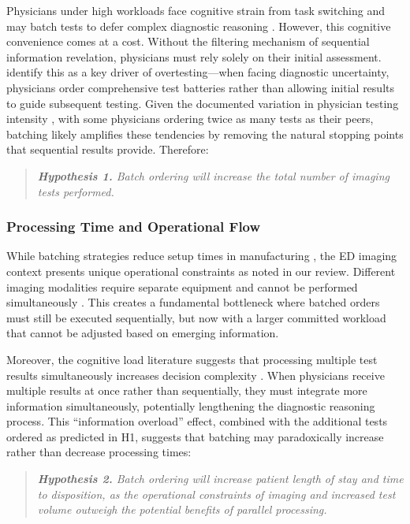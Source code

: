 \documentclass[,,blindrev]{informs}
\begin{document}
Physicians under high workloads face cognitive strain from task
switching and may batch tests to defer complex diagnostic reasoning
\citep[\citet{skaugset2016can}]{kc2013does}. However, this cognitive
convenience comes at a cost. Without the filtering mechanism of
sequential information revelation, physicians must rely solely on their
initial assessment. \citet{lam2020why} identify this as a key driver of
overtesting---when facing diagnostic uncertainty, physicians order
comprehensive test batteries rather than allowing initial results to
guide subsequent testing. Given the documented variation in physician
testing intensity \citep{hodgson2018are}, with some physicians ordering
twice as many tests as their peers, batching likely amplifies these
tendencies by removing the natural stopping points that sequential
results provide. Therefore:

\vspace{1em}
\begin{quote}
\small
\textit{\textbf{Hypothesis 1.} Batch ordering will increase the total number of imaging tests performed.}
\end{quote}

\subsubsection{Processing Time and Operational
Flow}\label{processing-time-and-operational-flow}

While batching strategies reduce setup times in manufacturing
\citep{Fowler2022}, the ED imaging context presents unique operational
constraints as noted in our review. Different imaging modalities require
separate equipment and cannot be performed simultaneously
\citep{Jessome2020}. This creates a fundamental bottleneck where batched
orders must still be executed sequentially, but now with a larger
committed workload that cannot be adjusted based on emerging
information.

Moreover, the cognitive load literature suggests that processing
multiple test results simultaneously increases decision complexity
\citep{kc2013does}. When physicians receive multiple results at once
rather than sequentially, they must integrate more information
simultaneously, potentially lengthening the diagnostic reasoning
process. This ``information overload'' effect, combined with the
additional tests ordered as predicted in H1, suggests that batching may
paradoxically increase rather than decrease processing times:

\vspace{1em}
\begin{quote}
\small
\textit{\textbf{Hypothesis 2.} Batch ordering will increase patient length of stay and time to disposition, as the operational constraints of imaging and increased test volume outweigh the potential benefits of parallel processing.}
\end{quote}
\end{document}
